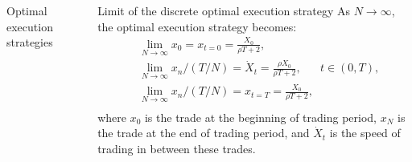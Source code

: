 \documentclass[]{beamer}
\begin{document}
\begin{frame}[t]
\begin{columns}[t]
\begin{column}{\onecolwid}
\begin{block}{Optimal execution strategies }
            \end{block}
    
   
    
    \end{column}
    
    
    \begin{column}{\sepwid}\end{column} %
    
    \begin{column}{\onecolwid} %
    
        
        \begin{alertblock}{Limit of the discrete optimal execution strategy}
            As $N \rightarrow \infty$, the optimal execution strategy becomes:
            \begin{align*}
                & \lim _{N \rightarrow \infty} x_0 = x_{t = 0} = \frac{X_0}{\rho T + 2}, \\
                & \lim _{N \rightarrow \infty} x_n / (T/N) = \dot X _t = \frac{\rho X_0}{\rho T + 2}, \;\;\;\;\;\; t \in (0, T), \\
                & \lim _{N \rightarrow \infty} x_n / (T/N) = x_{t=T}=  \frac{X_0}{\rho T + 2},  \\
            \end{align*}
            where $x_0$ is the trade at the beginning of trading period, $x_N$ is the trade at the end of trading
            period, and $\dot X _t$ is the speed of trading in between these trades.
        \end{alertblock}


\end{column}
\end{columns}
\end{frame}
\end{document}
